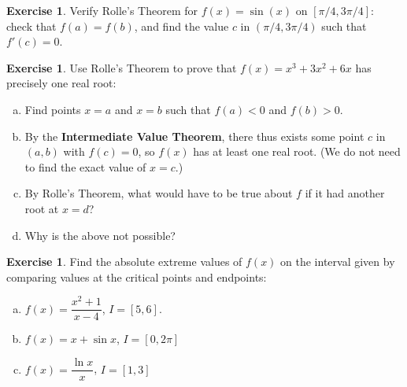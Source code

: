 \documentclass[11pt,reqno,final]{amsart}
\numberwithin{figure}{section}
\theoremstyle{definition} %
\newtheorem{exercise}[question]{Exercise}
\begin{document}
\begin{exercise}
        Verify Rolle's Theorem for $f(x) = \sin(x)$ on $[\pi/4,3\pi/4]$:
        check that $f(a) = f(b)$, and find the value $c$ in $(\pi/4,3\pi/4)$ such that $f'(c) = 0$.
        \vfill
\end{exercise}

\begin{exercise}
        Use Rolle's Theorem to prove that $f(x) = x^3+3x^2+6x$ has precisely one real root:
        \begin{enumerate}[(a)]
        \item Find points $x = a$ and $x=b$ such that $f(a) < 0$ and $f(b) > 0$.
                \vfill
        \item By the \textbf{Intermediate Value Theorem}, there thus exists some point $c$ in $(a,b)$ with $f(c) = 0$, so
                $f(x)$ has at least one real root.
                (We do not need to find the exact value of $x=c$.)
        \item By Rolle's Theorem, what would have to be true about $f$ if it had another root at $x=d$?
                \vfill
        \item Why is the above not possible?
                \vfill
        \end{enumerate}
\end{exercise}

\newpage

\begin{exercise}
        Find the absolute extreme values of $f(x)$ on the interval given
        by comparing values at the critical points and endpoints:
        \begin{enumerate}[(a)]                
        \item $f(x) = \dfrac{x^2+1}{x-4}$, $I = [5,6]$.
                \vfill
        \item $f(x) = x + \sin x$, $I = [0, 2\pi]$
                \vfill
        \item $f(x) = \dfrac{\ln x}{x}$, $I = [1,3]$
                \vfill
        \end{enumerate}
\end{exercise}
\end{document}
